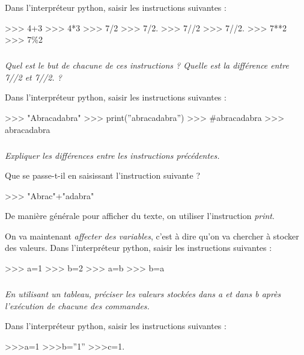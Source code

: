 \documentclass[10pt]{article}
\begin{document}
Dans l'interpréteur python, saisir les instructions suivantes :
\begin{py}
\begin{python}
>>> 4+3
>>> 4*3
>>> 7/2
>>> 7/2.
>>> 7//2
>>> 7//2.
>>> 7**2
>>> 7\%2
\end{python}
\end{py}

\subparagraph{}
\textit{Quel est le but de chacune de ces instructions ? Quelle est la différence entre \textsf{7//2} et \textsf{7//2.} ?}

Dans l'interpréteur python, saisir les instructions suivantes :
\begin{py}
\begin{python}
>>> "Abracadabra"
>>> print(''abracadabra'')
>>>  #abracadabra
>>>  abracadabra
\end{python}
\end{py}

\subparagraph{}
\textit{Expliquer les différences entre les instructions précédentes.}


\begin{rem}
Que se passe-t-il en saisissant l'instruction suivante ?
\begin{py}
\begin{python}
>>> "Abrac"+"adabra"
\end{python}
\end{py}
\end{rem}

\begin{rem}
De manière générale pour afficher du texte, on utiliser l'instruction \textsl{print}.
\end{rem}

On va maintenant \textit{affecter des variables}, c'est à dire qu'on va chercher à stocker des valeurs. Dans l'interpréteur python, saisir les instructions suivantes :

\begin{py}
\begin{python}
>>> a=1
>>> b=2
>>> a=b
>>> b=a
\end{python}
\end{py}

\subparagraph{} 
\textit{En utilisant un tableau, préciser les valeurs stockées dans a et dans b après l’exécution de chacune des commandes.}


Dans l'interpréteur python, saisir les instructions suivantes :
\begin{py}
\begin{python}
>>>a=1
>>>b=''1''
>>>c=1.
\end{python}
\end{py}
\end{document}
